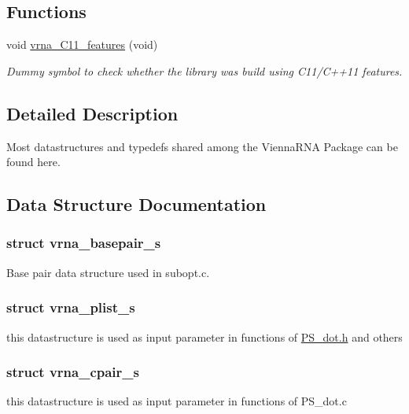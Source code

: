 \subsection*{Functions}
\begin{DoxyCompactItemize}
\item 
void \hyperlink{group__data__structures_ga21744ae2d6a17309f9327d3547cef0cb}{vrna\+\_\+\+C11\+\_\+features} (void)
\begin{DoxyCompactList}\small\item\em Dummy symbol to check whether the library was build using C11/\+C++11 features. \end{DoxyCompactList}\end{DoxyCompactItemize}


\subsection{Detailed Description}
Most datastructures and typedefs shared among the Vienna\+R\+NA Package can be found here. 



\subsection{Data Structure Documentation}
\label{structvrna__basepair__s}
\hypertarget{group__data__structures_structvrna__basepair__s}{}
\subsubsection{struct vrna\+\_\+basepair\+\_\+s}
Base pair data structure used in subopt.\+c. \label{structvrna__plist__s}
\hypertarget{group__data__structures_structvrna__plist__s}{}
\subsubsection{struct vrna\+\_\+plist\+\_\+s}
this datastructure is used as input parameter in functions of \hyperlink{PS__dot_8h}{P\+S\+\_\+dot.\+h} and others \label{structvrna__cpair__s}
\hypertarget{group__data__structures_structvrna__cpair__s}{}
\subsubsection{struct vrna\+\_\+cpair\+\_\+s}
this datastructure is used as input parameter in functions of P\+S\+\_\+dot.\+c \label{structvrna__sect__s}
\hypertarget{group__data__structures_structvrna__sect__s}{}
